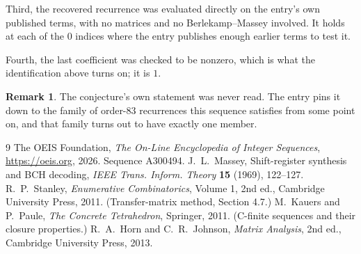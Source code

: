 \documentclass[11pt,a4paper]{article}
\theoremstyle{plain}
\theoremstyle{definition}
\newtheorem{remark}[theorem]{Remark}
\begin{document}
Third, the recovered recurrence was evaluated directly on the entry's own published terms, with
no matrices and no Berlekamp--Massey involved. It holds at each of the $0$ indices where
the entry publishes enough earlier terms to test it.

Fourth, the last coefficient was checked to be nonzero, which is what the identification above
turns on; it is $1$.

\begin{remark}
The conjecture's own statement was never read. The entry pins it down to the family of
order-$83$ recurrences this sequence satisfies from some point on, and that family turns
out to have exactly one member.
\end{remark}

\begin{thebibliography}{9}
 The OEIS Foundation, \emph{The On-Line Encyclopedia of Integer
Sequences}, \url{https://oeis.org}, 2026. Sequence A300494.
 J.~L.~Massey, Shift-register synthesis and BCH decoding, \emph{IEEE
Trans. Inform. Theory} \textbf{15} (1969), 122--127.
 R.~P.~Stanley, \emph{Enumerative Combinatorics}, Volume 1, 2nd ed.,
Cambridge University Press, 2011. (Transfer-matrix method, Section 4.7.)
 M.~Kauers and P.~Paule, \emph{The Concrete Tetrahedron}, Springer, 2011.
(C-finite sequences and their closure properties.)
 R.~A.~Horn and C.~R.~Johnson, \emph{Matrix Analysis}, 2nd ed., Cambridge
University Press, 2013.
\end{thebibliography}
\end{document}
